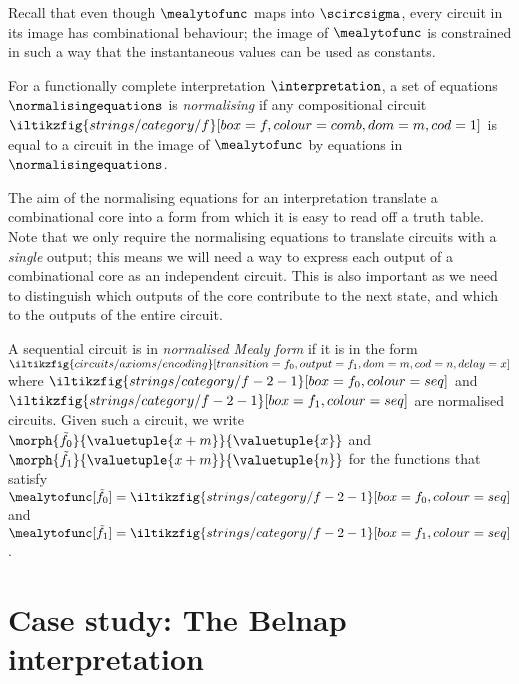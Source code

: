 \begin{remark}
    Recall that even though \(\mealytofunc\) maps into \(\scircsigma\), every
    circuit in its image has combinational behaviour; the image of
    \(\mealytofunc\) is constrained in such a way that the instantaneous values
    can be used as constants.
\end{remark}

\begin{definition}
    For a functionally complete interpretation \(\interpretation\), a set of
    equations \(\normalisingequations\) is \emph{normalising} if any
    compositional circuit \(
        \iltikzfig{strings/category/f}[box=f,colour=comb,dom=m,cod=1]
    \) is equal to a circuit in the image of \(\mealytofunc\) by equations in
    \(\normalisingequations\).
\end{definition}

The aim of the normalising equations for an interpretation translate a
combinational core into a form from which it is easy to read off a truth table.
Note that we only require the normalising equations to translate circuits with a
\emph{single} output; this means we will need a way to express each output of
a combinational core as an independent circuit.
This is also important as we need to distinguish which outputs of the core
contribute to the next state, and which to the outputs of the entire circuit.

\begin{definition}
    A sequential circuit is in \emph{normalised Mealy form} if it is in the form
    \(
        \iltikzfig{circuits/axioms/encoding}[transition={f_0},output={f_1},dom=m,cod=n,delay=x]
    \) where \(
        \iltikzfig{strings/category/f-2-1}[box=f_0,colour=seq]
    \) and \(
        \iltikzfig{strings/category/f-2-1}[box=f_1,colour=seq]
    \) are normalised circuits.
    Given such a circuit, we write \(
        \morph{\tilde{f}_{0}}{\valuetuple{x+m}}{{\valuetuple{x}}}
    \) and \(
        \morph{\tilde{f}_{1}}{\valuetuple{x+m}}{{\valuetuple{n}}}
    \) for the functions that satisfy \(
        \mealytofunc[\tilde{f}_{0}] = \iltikzfig{strings/category/f-2-1}[box=f_0,colour=seq]
    \) and \(
        \mealytofunc[\tilde{f}_{1}] = \iltikzfig{strings/category/f-2-1}[box=f_1,colour=seq]
    \).
\end{definition}


\section{Case study: The Belnap interpretation}


